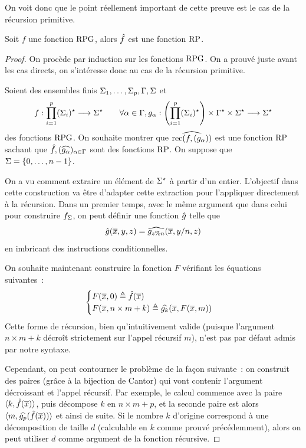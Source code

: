 On voit donc que le point réellement important de cette preuve est le cas de
la récursion primitive.

\begin{lemma}
  Soit $f$ une fonction $\operatorname{RPG}$, alors $\hat{f}$ est une fonction $\operatorname{RP}$.
\end{lemma}

\begin{proof}
  On procède par induction sur les fonctions $\operatorname{RPG}$. On a prouvé juste avant les
  cas directs, on s'intéresse donc au cas de la récursion primitive.

  Soient des ensembles finis $\Sigma_1,\ldots,\Sigma_p,\Gamma,\Sigma$ et
  \[f : \displaystyle \prod_{i = 1}^p(\Sigma_{i})^{\star} \longrightarrow \Sigma^{\star}
  \qquad\forall \alpha\in\Gamma,
  g_\alpha : \displaystyle \left(\prod_{i = 1}^p (\Sigma_{i})^{\star}\right)\times\Gamma^{\star}\times\Sigma^{\star} \longrightarrow \Sigma^{\star}\]
  des fonctions $\operatorname{RPG}$. On souhaite montrer que $\widehat{\operatorname{rec}(f,(g_{\alpha}))}$
  est une fonction $\operatorname{RP}$ sachant que
  $\hat{f}, (\widehat{g_{\alpha}})_{\alpha\in\Gamma}$ sont des fonctions $\operatorname{RP}$. On
  suppose que $\Sigma = \{0,\ldots,n - 1\}$.
  
  On a vu comment extraire un élément de $\Sigma^{\star}$ à partir d'un entier.
  L'objectif dans cette construction va être d'adapter cette extraction pour
  l'appliquer directement à la récursion. Dans un premier temps, avec le même
  argument que dans celui pour construire $f_\Sigma$, on peut définir une fonction
  $\hat{g}$ telle que
  \[\hat{g} (\overline{x},y,z) = \widehat{g_{z\% n}}(\overline{x},y/n,z)\]
  en imbricant des instructions conditionnelles.
  
  On souhaite maintenant construire la fonction $F$ vérifiant les équations
  suivantes~:
  \[\begin{cases}
  F(\overline{x},0) \triangleq \hat{f}(\overline{x})\\
  F(\overline{x},n\times m + k) \triangleq \widehat{g_{k}}(\overline{x},F(\overline{x},m))
  \end{cases}\]
  Cette forme de récursion, bien qu'intuitivement valide (puisque l'argument
  $n \times m + k$ décroît strictement sur l'appel récursif $m$), n'est pas par
  défaut admis par notre syntaxe.
  
  Cependant, on peut contourner le problème de la façon suivante~: on construit
  des paires (grâce à la bijection de Cantor) qui vont contenir l'argument
  décroissant et l'appel récursif. Par exemple, le calcul commence avec la paire
  $\langle k,\hat{f}(\overline{x})\rangle$, puis décompose $k$ en $n\times m + p$,
  et la seconde paire est alors
  $\langle m,\widehat{g_{p}}(\hat{f}(\overline{x}))\rangle$ et ainsi de suite.
  Si le nombre $k$ d'origine correspond à une décomposition de taille $d$
  (calculable en $k$ comme prouvé précédemment), alors on peut utiliser
  $d$ comme argument de la fonction récursive.
  

\end{proof}
